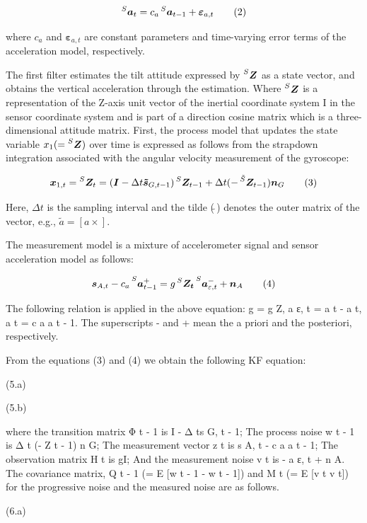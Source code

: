 \documentclass[10pt,journal,compsoc]{IEEEtran}
\begin{document}
\[\prescript{S}{}{\bm{a}_t} = c_a\prescript{S}{}{\bm{a}_{t-1}}+\bm{\varepsilon}_{a,t}\tag{2}\]

\noindent where $c_a$ and $\bm{\varepsilon}_{a,t}$ are constant parameters and time-varying error terms of
the acceleration model, respectively.

The first filter estimates the tilt attitude expressed by
$\prescript{S}{}{\bm{Z}}$ as a state vector, and obtains the vertical
acceleration through the estimation. Where $\prescript{S}{}{\bm{Z}}$ is a
representation of the Z-axis unit vector of the inertial coordinate system I in
the sensor coordinate system and is part of a direction cosine matrix which is
a three-dimensional attitude matrix. First, the process model that updates the
state variable $x_1 (= \prescript{S}{}{\bm{Z}})$ over time is expressed as
follows from the strapdown integration associated with the angular velocity
measurement of the gyroscope:

\[\bm{x}_{1,t}=\prescript{S}{}{\bm{Z}_t}=
(\bm{I}-\Delta t\bm{\tilde{s}}_{G,t-1})\prescript{S}{}{\bm{Z}_{t-1}}+\Delta t(-\prescript{\tilde{S}}{}{\bm{Z}_{t-1}})\bm{n}_G\tag{3}\]

Here, $\Delta t$ is the sampling interval and the tilde ($\tilde{~}$) denotes the outer matrix of
the vector, e.g., $\tilde{a} = [a \times]$.

The measurement model is a mixture of accelerometer signal and sensor acceleration model as follows:

\[\bm{s}_{A,t}-c_a\prescript{S}{}{\bm{a}^+_{t-1}}=g\prescript{S}{}{\bm{Z_t}}\prescript{S}{}{\bm{a}^-_{\varepsilon,t}}+\bm{n}_A\tag{4}\]


The following relation is applied in the above equation: g = g Z, a ε, t = a t
- a t, a t = c a a t - 1. The superscripts - and + mean the a priori and the
posteriori, respectively.

From the equations (3) and (4) we obtain the following KF equation:

(5.a)

(5.b)

where the transition matrix Φ t - 1 is I - Δ ts G, t - 1; The process noise w t
- 1 is Δ t (- Z t - 1) n G; The measurement vector z t is s A, t - c a a t - 1;
The observation matrix H t is gI; And the measurement noise v t is - a ε, t + n
A. The covariance matrix, Q t - 1 (= E [w t - 1 - w t - 1]) and M t (= E [v t v
t]) for the progressive noise and the measured noise are as follows.

(6.a)
\end{document}

